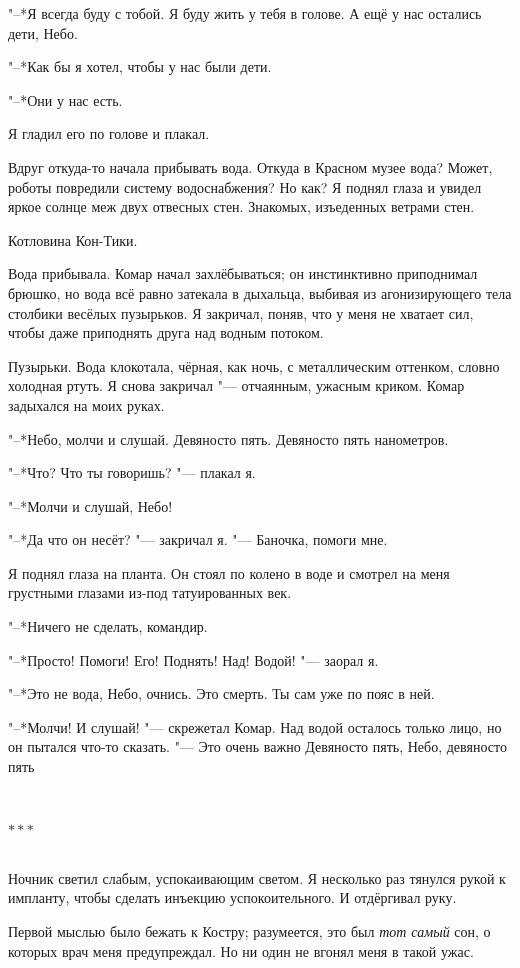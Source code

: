 \documentclass[a4paper,10pt,fleqn]{book}
\newcommand{\ldotst}{\so{...}\xspace}
\newcommand{\razd}{~\\{\centering\Large\bfseries$\ast \ast \ast$\par}~\\}
\begin{document}
"--*Я всегда буду с тобой.
Я буду жить у тебя в голове.
А ещё у нас остались дети, Небо.

"--*Как бы я хотел, чтобы у нас были дети.

"--*Они у нас есть.

Я гладил его по голове и плакал.

Вдруг откуда-то начала прибывать вода.
Откуда в Красном музее вода?
Может, роботы повредили систему водоснабжения?
Но как?
Я поднял глаза\ldotst и увидел яркое солнце меж двух отвесных стен.
Знакомых, изъеденных ветрами стен.

Котловина Кон-Тики.

Вода прибывала.
Комар начал захлёбываться;
он инстинктивно приподнимал брюшко, но вода всё равно затекала в дыхальца, выбивая из агонизирующего тела столбики весёлых пузырьков.
Я закричал, поняв, что у меня не хватает сил, чтобы даже приподнять друга над водным потоком.

Пузырьки.
Вода клокотала, чёрная, как ночь, с металлическим оттенком, словно холодная ртуть.
Я снова закричал "--- отчаянным, ужасным криком.
Комар задыхался на моих руках.

"--*Небо, молчи и слушай.
Девяносто пять.
Девяносто пять нанометров.

"--*Что?
Что ты говоришь? "--- плакал я.

"--*Молчи и слушай, Небо!

"--*Да что он несёт? "--- закричал я.
"--- Баночка, помоги мне.

Я поднял глаза на планта.
Он стоял по колено в воде и смотрел на меня грустными глазами из-под татуированных век.

"--*Ничего не сделать, командир.

"--*Просто! Помоги! Его! Поднять! Над! Водой! "--- заорал я.

"--*Это не вода, Небо, очнись.
Это смерть.
Ты сам уже по пояс в ней.

"--*Молчи! И слушай! "--- скрежетал Комар.
Над водой осталось только лицо, но он пытался что-то сказать.
"--- Это очень важно\ldotst
Девяносто пять, Небо, девяносто пять\ldotst

\razd

Ночник светил слабым, успокаивающим светом.
Я несколько раз тянулся рукой к импланту, чтобы сделать инъекцию успокоительного.
И отдёргивал руку.

Первой мыслью было бежать к Костру;
разумеется, это был \textit{тот самый} сон, о которых врач меня предупреждал.
Но ни один не вгонял меня в такой ужас.
\end{document}

